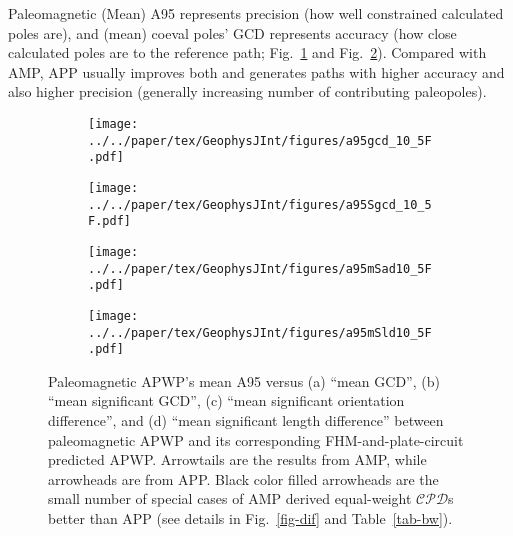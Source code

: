 Paleomagnetic (Mean) A95 represents precision (how well constrained calculated
poles are), and (mean) coeval poles' GCD represents accuracy (how close
calculated poles are to the reference path; Fig.~\ref{fig-A95GCD105F} and
Fig.~\ref{fig-A95SGCD105F}). Compared with AMP, APP usually improves both and
generates paths with higher accuracy and also higher precision (generally
increasing number of contributing paleopoles).

\begin{figure}[!ht]
\captionsetup[subfigure]{singlelinecheck=off,justification=raggedright,aboveskip=-6pt,belowskip=-6pt}
\centering
  \begin{subfigure}[htbp]{.49\textwidth}
	\caption{}\texttt{[image: ../../paper/tex/GeophysJInt/figures/a95gcd\_10\_5F.pdf]}\label{fig-A95GCD105F}
  \end{subfigure}
  \begin{subfigure}[htbp]{.49\textwidth}
	\caption{}\texttt{[image: ../../paper/tex/GeophysJInt/figures/a95Sgcd\_10\_5F.pdf]}\label{fig-A95SGCD105F}
  \end{subfigure}
  \begin{subfigure}[htbp]{.49\textwidth}
	\caption{}\texttt{[image: ../../paper/tex/GeophysJInt/figures/a95mSad10\_5F.pdf]}\label{fig-A95mSad105F}
  \end{subfigure}
  \begin{subfigure}[htbp]{.49\textwidth}
	\caption{}\texttt{[image: ../../paper/tex/GeophysJInt/figures/a95mSld10\_5F.pdf]}\label{fig-A95mSld105F}
  \end{subfigure}
  \caption[APP spatially better than AMP (arrow)]{Paleomagnetic APWP's mean A95 versus
(a) ``mean GCD'', (b) ``mean significant GCD'', (c) ``mean significant
orientation difference'', and (d) ``mean significant length difference'' between
paleomagnetic APWP and its corresponding FHM-and-plate-circuit predicted APWP\@.
Arrowtails are the results from AMP, while arrowheads are from APP\@. Black
color filled arrowheads are the small number of special cases of AMP derived
equal-weight $\mathcal{CPD}$s better than APP (see details in Fig.~\ref{fig-dif}
and Table~\ref{tab-bw}).}\label{fig-A95mG105F}
\end{figure}

